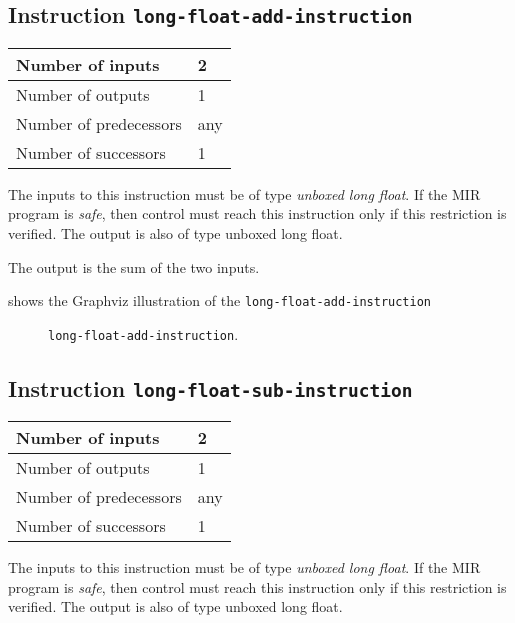 \subsection{Instruction \texttt{long-float-add-instruction}}
\label{mir-instruction-long-float-add}

\begin{tabular}{|l|l|}
\hline
Number of inputs & 2\\
\hline
Number of outputs & 1\\
\hline
Number of predecessors & any\\
\hline
Number of successors & 1\\
\hline
\end{tabular}

The inputs to this instruction must be of type \emph{unboxed long
  float}.  If the MIR program is \emph{safe}, then control must reach
this instruction only if this restriction is verified.  The output is
also of type unboxed long float.

The output is the sum of the two inputs.

 shows the Graphviz illustration of the
\texttt{long-float-add-instruction}

\begin{figure}
\begin{center}
\end{center}
\caption{\label{fig-long-float-add-instruction}
\texttt{long-float-add-instruction}.}
\end{figure}

\subsection{Instruction \texttt{long-float-sub-instruction}}
\label{mir-instruction-long-float-sub}

\begin{tabular}{|l|l|}
\hline
Number of inputs & 2\\
\hline
Number of outputs & 1\\
\hline
Number of predecessors & any\\
\hline
Number of successors & 1\\
\hline
\end{tabular}

The inputs to this instruction must be of type \emph{unboxed long
  float}.  If the MIR program is \emph{safe}, then control must reach
this instruction only if this restriction is verified.  The output is
also of type unboxed long float.

